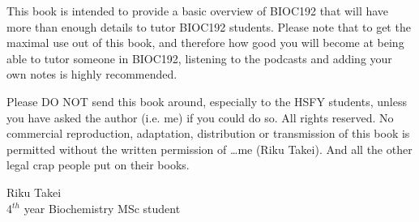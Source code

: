 This book is intended to provide a basic overview of BIOC192 that will have more than enough details to tutor BIOC192 students.
Please note that to get the maximal use out of this book, and therefore how good you will become at being able to tutor someone in BIOC192, listening to the podcasts and adding your own notes is highly recommended.

Please DO NOT send this book around, especially to the HSFY students, unless you have asked the author (i.e. me) if you could do so.
All rights reserved.
No commercial reproduction, adaptation, distribution or transmission of this book is permitted without the written permission of \ldots me (Riku Takei).
And all the other legal crap people put on their books.

\vspace{5cm}

\noindent
Riku Takei \\
4$^{th}$ year Biochemistry MSc student\\
